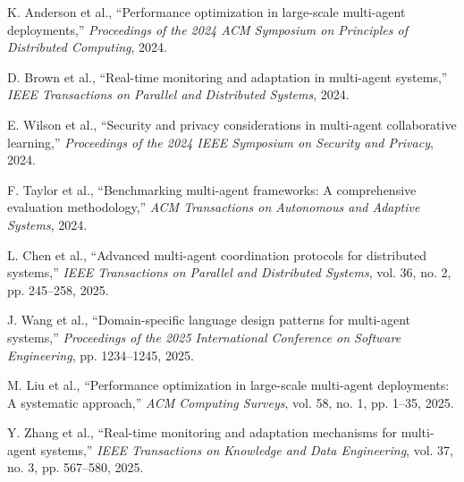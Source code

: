 \documentclass[conference]{IEEEtran}
\begin{document}
\begin{thebibliography}{00}
 K. Anderson et al., ``Performance optimization in large-scale multi-agent deployments,'' \emph{Proceedings of the 2024 ACM Symposium on Principles of Distributed Computing}, 2024.

 D. Brown et al., ``Real-time monitoring and adaptation in multi-agent systems,'' \emph{IEEE Transactions on Parallel and Distributed Systems}, 2024.

 E. Wilson et al., ``Security and privacy considerations in multi-agent collaborative learning,'' \emph{Proceedings of the 2024 IEEE Symposium on Security and Privacy}, 2024.

 F. Taylor et al., ``Benchmarking multi-agent frameworks: A comprehensive evaluation methodology,'' \emph{ACM Transactions on Autonomous and Adaptive Systems}, 2024.

 L. Chen et al., ``Advanced multi-agent coordination protocols for distributed systems,'' \emph{IEEE Transactions on Parallel and Distributed Systems}, vol. 36, no. 2, pp. 245--258, 2025.

 J. Wang et al., ``Domain-specific language design patterns for multi-agent systems,'' \emph{Proceedings of the 2025 International Conference on Software Engineering}, pp. 1234--1245, 2025.

 M. Liu et al., ``Performance optimization in large-scale multi-agent deployments: A systematic approach,'' \emph{ACM Computing Surveys}, vol. 58, no. 1, pp. 1--35, 2025.

 Y. Zhang et al., ``Real-time monitoring and adaptation mechanisms for multi-agent systems,'' \emph{IEEE Transactions on Knowledge and Data Engineering}, vol. 37, no. 3, pp. 567--580, 2025.
\end{thebibliography}
\end{document}
